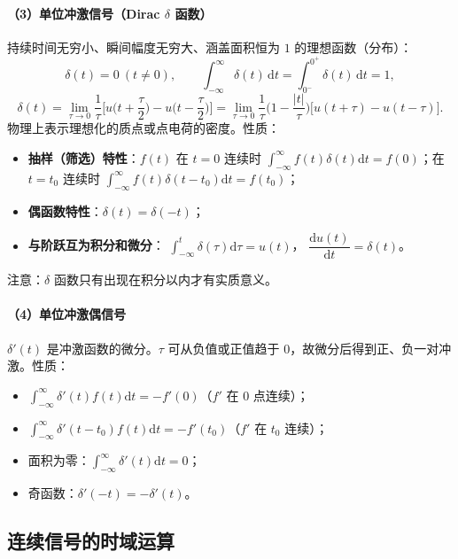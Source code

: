 \paragraph{（3）单位冲激信号（Dirac $\delta$ 函数）}
持续时间无穷小、瞬间幅度无穷大、涵盖面积恒为 $1$ 的理想函数（分布）：
\begin{equation}
\delta(t)=0\ (t\neq0),\qquad
\int_{-\infty}^{\infty}\delta(t)\,\mathrm{d}t=\int_{0^-}^{0^+}\delta(t)\,\mathrm{d}t=1,
\end{equation}
\begin{equation}
\delta(t)=\lim_{\tau\to0}\frac{1}{\tau}\Big[u\Big(t+\frac{\tau}{2}\Big)-u\Big(t-\frac{\tau}{2}\Big)\Big]
=\lim_{\tau\to0}\frac{1}{\tau}\Big(1-\frac{|t|}{\tau}\Big)\big[u(t+\tau)-u(t-\tau)\big].
\end{equation}
物理上表示理想化的质点或点电荷的密度。性质：
\begin{itemize}
\item \textbf{抽样（筛选）特性}：$f(t)$ 在 $t=0$ 连续时
  $\displaystyle\int_{-\infty}^{\infty}f(t)\delta(t)\mathrm{d}t=f(0)$；在 $t=t_0$ 连续时
  $\displaystyle\int_{-\infty}^{\infty}f(t)\delta(t-t_0)\mathrm{d}t=f(t_0)$；
\item \textbf{偶函数特性}：$\delta(t)=\delta(-t)$；
\item \textbf{与阶跃互为积分和微分}：
  $\displaystyle\int_{-\infty}^{t}\delta(\tau)\mathrm{d}\tau=u(t)$，
  $\dfrac{\mathrm{d}u(t)}{\mathrm{d}t}=\delta(t)$。
\end{itemize}
注意：$\delta$ 函数只有出现在积分以内才有实质意义。

\paragraph{（4）单位冲激偶信号}
$\delta'(t)$ 是冲激函数的微分。$\tau$ 可从负值或正值趋于 $0$，故微分后得到正、负一对冲激。性质：
\begin{itemize}
\item $\displaystyle\int_{-\infty}^{\infty}\delta'(t)f(t)\mathrm{d}t=-f'(0)$（$f'$ 在 $0$ 点连续）；
\item $\displaystyle\int_{-\infty}^{\infty}\delta'(t-t_0)f(t)\mathrm{d}t=-f'(t_0)$（$f'$ 在 $t_0$ 连续）；
\item 面积为零：$\displaystyle\int_{-\infty}^{\infty}\delta'(t)\mathrm{d}t=0$；
\item 奇函数：$\delta'(-t)=-\delta'(t)$。
\end{itemize}

\subsection{连续信号的时域运算}

